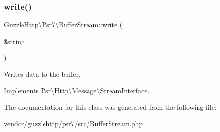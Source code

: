 \subsubsection{\texorpdfstring{write()}{write()}}
{\footnotesize\ttfamily Guzzle\+Http\textbackslash{}\+Psr7\textbackslash{}\+Buffer\+Stream\+::write (\begin{DoxyParamCaption}\item[{}]{\$string }\end{DoxyParamCaption})}

Writes data to the buffer. 

Implements \hyperlink{interfacePsr_1_1Http_1_1Message_1_1StreamInterface_aabf9fe3e09f85753834cdb69bbdf3c3d}{Psr\textbackslash{}\+Http\textbackslash{}\+Message\textbackslash{}\+Stream\+Interface}.



The documentation for this class was generated from the following file\+:\begin{DoxyCompactItemize}
\item 
vendor/guzzlehttp/psr7/src/Buffer\+Stream.\+php\end{DoxyCompactItemize}
